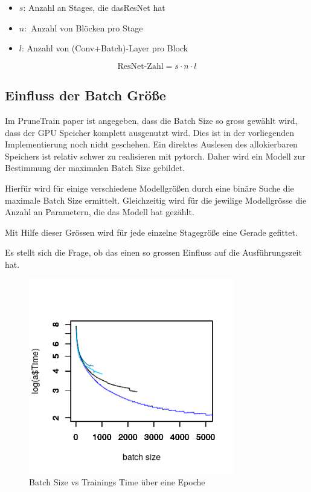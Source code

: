 \begin{itemize}
 \item $s$: Anzahl an Stages, die dasResNet hat
 \item $n:$ Anzahl von Blöcken pro Stage 
 \item $l$: Anzahl von (Conv+Batch)-Layer pro Block
\end{itemize}
$$\text{ResNet-Zahl}=s\cdot n \cdot l$$


\subsection{Einfluss der Batch Größe}
Im PruneTrain paper ist angegeben, dass die Batch Size so gross gewählt wird, dass der GPU Speicher komplett ausgenutzt wird. Dies ist in der vorliegenden Implementierung noch nicht geschehen. Ein direktes Auslesen des allokierbaren Speichers ist relativ schwer zu realisieren mit pytorch. Daher wird ein Modell zur Bestimmung der maximalen Batch Size gebildet.

Hierfür wird für einige verschiedene Modellgrößen durch eine binäre Suche die maximale Batch Size ermittelt. Gleichzeitig wird für die jewilige Modellgrösse die Anzahl an Parametern, die das Modell hat gezählt.

Mit Hilfe dieser Grössen wird für jede einzelne Stagegröße eine Gerade gefittet.



Es stellt sich die Frage, ob das einen so grossen Einfluss auf die Ausführungszeit hat.

\begin{figure}[h]
 \centering
 \includegraphics[width=0.8\textwidth]{KapitelPartB/Images/batchSizevsTime.png}
 \caption{Batch Size vs Trainings Time über eine Epoche}
 \label{fig:batchVsTime}
\end{figure}


